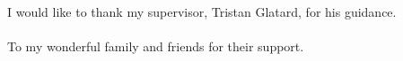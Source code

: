 \begin{acknowledgments}
  I would like to thank my supervisor, Tristan Glatard, for his guidance.
  \\
  \\
  To my wonderful family and friends for their support.
\end{acknowledgments}